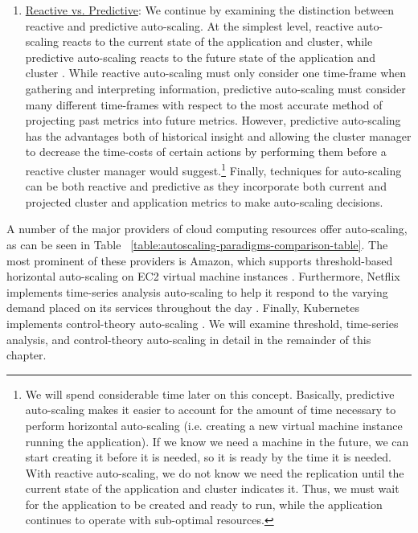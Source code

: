 \begin{enumerate}
  \item \underline{Reactive vs. Predictive}: We continue by
    examining the distinction between reactive and predictive
    auto-scaling. At the simplest level, reactive auto-scaling reacts to
    the current state of the application and cluster, while predictive
    auto-scaling reacts to the future state of the application and cluster
    \cite{auto-scaling-techniques-for-elastic-applications-in-cloud-environments}.
    While reactive auto-scaling must only consider one
    time-frame when gathering and interpreting information, predictive
    auto-scaling must consider many different time-frames with respect to the
    most accurate method of projecting past metrics into future metrics. However,
    predictive auto-scaling has the advantages both of historical insight and allowing
    the cluster manager to decrease the time-costs of certain actions by performing
    them before a reactive cluster manager would suggest.\footnote{We will spend
    considerable time later on this concept. Basically, predictive auto-scaling
    makes it easier to account for the amount of time necessary to perform
    horizontal auto-scaling (i.e. creating a new virtual machine instance running
    the application). If we know we need a machine in the future, we can start
    creating it before it is needed, so it is ready by the time it is needed. With reactive
    auto-scaling, we do not know we need the replication until the current state of
    the application and cluster indicates it. Thus, we must wait for the
    application to be created and ready to run,
    while the application continues to operate with sub-optimal resources.}
    Finally, techniques for auto-scaling can be both reactive and predictive as
    they incorporate both current and projected cluster and application metrics
    to make auto-scaling decisions.
\end{enumerate}

A number of the major providers of cloud computing resources offer auto-scaling,
as can be seen in Table ~\ref{table:autoscaling-paradigms-comparison-table}.
The most prominent of these providers is Amazon, which supports threshold-based
horizontal auto-scaling on EC2 virtual machine
instances \cite{amazon-auto-scaling-developer-guide}. Furthermore, Netflix
implements time-series analysis auto-scaling to help it respond to the
varying demand placed on its services throughout the
day \cite{netflix-scryer-part-i}. Finally, Kubernetes
implements control-theory auto-scaling
\cite{k8s-horizontal-pod-autoscaler-proposal}.
We will examine threshold, time-series analysis, and control-theory
auto-scaling in detail in the remainder of this chapter.

